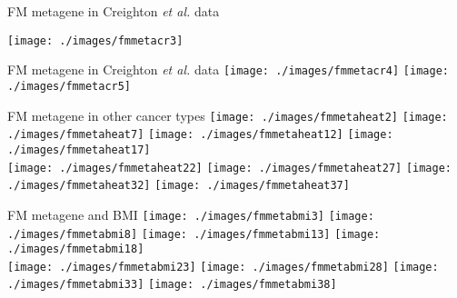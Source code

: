 \documentclass[handout]{beamer}
\begin{document}
\begin{frame}{FM metagene in Creighton \textit{et al.} data}
	\begin{center}
		\texttt{[image: ./images/fmmetacr3]}
	\end{center}
\end{frame}

\begin{frame}{FM metagene in Creighton \textit{et al.} data}
	\texttt{[image: ./images/fmmetacr4]}
	\texttt{[image: ./images/fmmetacr5]}
\end{frame}

\begin{frame}{FM metagene in other cancer types}
	\texttt{[image: ./images/fmmetaheat2]}
	\texttt{[image: ./images/fmmetaheat7]}
	\texttt{[image: ./images/fmmetaheat12]}
	\texttt{[image: ./images/fmmetaheat17]}\\
	\texttt{[image: ./images/fmmetaheat22]}
	\texttt{[image: ./images/fmmetaheat27]}
	\texttt{[image: ./images/fmmetaheat32]}
	\texttt{[image: ./images/fmmetaheat37]}
\end{frame}

\begin{frame}{FM metagene and BMI}
	\texttt{[image: ./images/fmmetabmi3]}
	\texttt{[image: ./images/fmmetabmi8]}
	\texttt{[image: ./images/fmmetabmi13]}
	\texttt{[image: ./images/fmmetabmi18]}\\
	\texttt{[image: ./images/fmmetabmi23]}
	\texttt{[image: ./images/fmmetabmi28]}
	\texttt{[image: ./images/fmmetabmi33]}
	\texttt{[image: ./images/fmmetabmi38]}
\end{frame}

\end{document}
